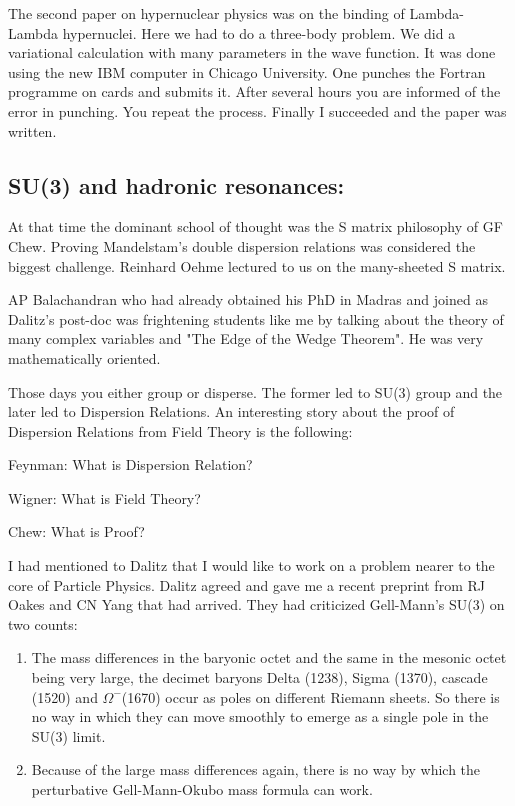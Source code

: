 The second paper on hypernuclear physics was on the binding of 
Lambda-Lambda hypernuclei. Here we had to do a three-body problem. We 
did a variational calculation with many parameters in the wave function. 
It was done using the new IBM computer in Chicago University. One 
punches the Fortran programme on cards and submits it. After several 
hours you are informed of the error in punching. You repeat the process. 
Finally I succeeded and the paper was written.

\subsection*{SU(3) and hadronic resonances: }

At that time the dominant school of thought was the S matrix philosophy 
of GF Chew. Proving Mandelstam's double dispersion relations was 
considered the biggest challenge. Reinhard Oehme lectured to us on the 
many-sheeted S matrix.

AP Balachandran who had already obtained his PhD in Madras and joined as 
Dalitz's post-doc was frightening students like me by talking about the 
theory of many complex variables and "The Edge of the Wedge Theorem". He 
was very mathematically oriented.

Those days you either group or disperse. The former led to SU(3) group 
and the later led to Dispersion Relations. An interesting story about 
the proof of Dispersion Relations from Field Theory is the following:

Feynman: What is Dispersion Relation?

Wigner: What is Field Theory?

Chew: What is Proof?

I had mentioned to Dalitz that I would like to work on a problem nearer 
to the core of Particle Physics. Dalitz agreed and gave me a recent 
preprint from RJ Oakes and CN Yang that had arrived. They had criticized 
Gell-Mann's SU(3) on two counts:

\begin{enumerate}
\item The mass differences in the baryonic octet and the same in the mesonic 
octet being very large, the decimet baryons Delta (1238), Sigma (1370), 
cascade (1520) and $\Omega^-$(1670) occur as poles on different Riemann 
sheets. So there is no way in which they can move smoothly to emerge as 
a single pole in the SU(3) limit.
\item Because of the large mass differences again, there is no way by which 
the perturbative Gell-Mann-Okubo mass formula can work.
\end{enumerate}

